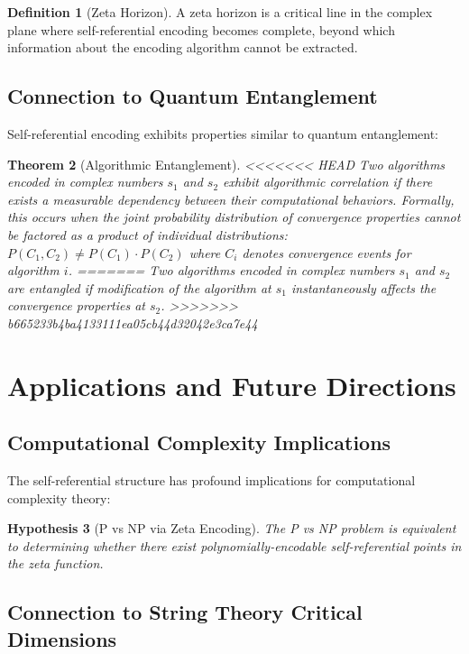 \documentclass[12pt]{article}
\theoremstyle{plain}
\newtheorem{theorem}{Theorem}[section]
\newtheorem{hypothesis}[theorem]{Hypothesis}
\theoremstyle{definition}
\newtheorem{definition}[theorem]{Definition}
\begin{document}
\begin{definition}[Zeta Horizon]
A zeta horizon is a critical line in the complex plane where self-referential encoding becomes complete, beyond which information about the encoding algorithm cannot be extracted.
\end{definition}

\subsection{Connection to Quantum Entanglement}

Self-referential encoding exhibits properties similar to quantum entanglement:

\begin{theorem}[Algorithmic Entanglement]
<<<<<<< HEAD
Two algorithms encoded in complex numbers $s_1$ and $s_2$ exhibit algorithmic correlation if there exists a measurable dependency between their computational behaviors. Formally, this occurs when the joint probability distribution of convergence properties cannot be factored as a product of individual distributions: $P(C_1, C_2) \neq P(C_1) \cdot P(C_2)$ where $C_i$ denotes convergence events for algorithm $i$.
=======
Two algorithms encoded in complex numbers $s_1$ and $s_2$ are entangled if modification of the algorithm at $s_1$ instantaneously affects the convergence properties at $s_2$.
>>>>>>> b665233b4ba4133111ea05cb44d32042e3ca7e44
\end{theorem}

\section{Applications and Future Directions}

\subsection{Computational Complexity Implications}

The self-referential structure has profound implications for computational complexity theory:

\begin{hypothesis}[P vs NP via Zeta Encoding]
The P vs NP problem is equivalent to determining whether there exist polynomially-encodable self-referential points in the zeta function.
\end{hypothesis}

\subsection{Connection to String Theory Critical Dimensions}
\end{document}
